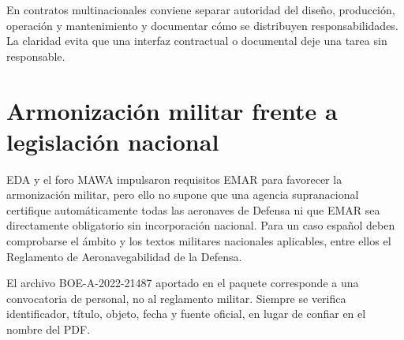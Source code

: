 En contratos multinacionales conviene separar autoridad del diseño, producción, operación y mantenimiento y documentar cómo se distribuyen responsabilidades. La claridad evita que una interfaz contractual o documental deje una tarea sin responsable.
\section{Armonización militar frente a legislación nacional}
EDA y el foro MAWA impulsaron requisitos EMAR para favorecer la armonización militar, pero ello no supone que una agencia supranacional certifique automáticamente todas las aeronaves de Defensa ni que EMAR sea directamente obligatorio sin incorporación nacional. Para un caso español deben comprobarse el ámbito y los textos militares nacionales aplicables, entre ellos el Reglamento de Aeronavegabilidad de la Defensa.

El archivo BOE-A-2022-21487 aportado en el paquete corresponde a una convocatoria de personal, no al reglamento militar. Siempre se verifica identificador, título, objeto, fecha y fuente oficial, en lugar de confiar en el nombre del PDF.


